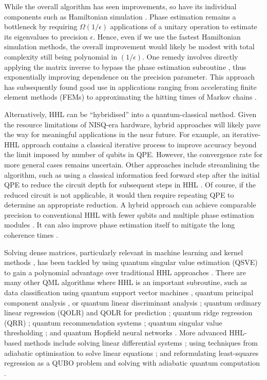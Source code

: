 \documentclass[10pt]{iopart}
\begin{document}
While the overall algorithm has seen improvements, so have its individual components such as Hamiltonian simulation \cite{Berry2007,Liu2022h}. Phase estimation remains a bottleneck by requiring $\Omega(1/\epsilon)$ applications of a unitary operation to estimate its eigenvalues to precision $\epsilon$. Hence, even if we use the fastest Hamiltonian simulation methods, the overall improvement would likely be modest with total complexity still being polynomial in $(1/ \epsilon)$. One remedy involves directly applying the matrix inverse to bypass the phase estimation subroutine \cite{Childs2017}, thus exponentially improving dependence on the precision parameter. This approach has subsequently found good use in applications ranging from accelerating finite element methods (FEMs) \cite{Montanaro2016a} to approximating the hitting times of Markov chains \cite{Chowdhury2017}. 

Alternatively, HHL can be ``hybridised'' into a quantum-classical method. Given the resource limitations of NISQ-era hardware, hybrid approaches will likely pave the way for meaningful applications in the near future. For example, an iterative-HHL approach \cite{Saito2021} contains a classical iterative process to improve accuracy beyond the limit imposed by number of qubits in QPE. However, the convergence rate for more general cases remains uncertain. Other approaches include streamlining the algorithm, such as using a classical information feed forward step after the initial QPE to reduce the circuit depth for subsequent steps in HHL \cite{lee2019hybrid}. Of course, if the reduced circuit is not applicable, it would then require repeating QPE to determine an appropriate reduction. A hybrid approach can achieve comparable precision to conventional HHL with fewer qubits and multiple phase estimation modules \cite{Gao2023h}. It can also improve phase estimation itself to mitigate the long coherence times \cite{angara2020hybrid}. 

Solving dense matrices, particularly relevant in machine learning and kernel methods \cite{Wilson2015}, has been tackled by using quantum singular value estimation (QSVE) to gain a polynomial advantage over traditional HHL approaches \cite{Wossnig2018}. There are many other QML algorithms where HHL is an important subroutine, such as data classification using quantum support vector machines \cite{Rebentrost2014}, quantum principal component analysis \cite{Lloyd2014}, or quantum linear discriminant analysis \cite{Cong2016}; quantum ordinary linear regression (QOLR) \cite{Wiebe2012,Wang2017a} and QOLR for prediction \cite{Schuld2016}; quantum ridge regression (QRR) \cite{Yu2021a}; quantum recommendation systems \cite{Kerenidis2017}; quantum singular value thresholding \cite{Duan2018}; and quantum Hopfield neural networks \cite{Rebentrost2018}. More advanced HHL-based methods include solving linear differential systems \cite{Berry2014,Berry2017}; using techniques from adiabatic optimisation to solve linear equations \cite{Subasi2019}; and reformulating least-squares regression as a QUBO problem and solving with adiabatic quantum computation \cite{Date2021}.
\end{document}
